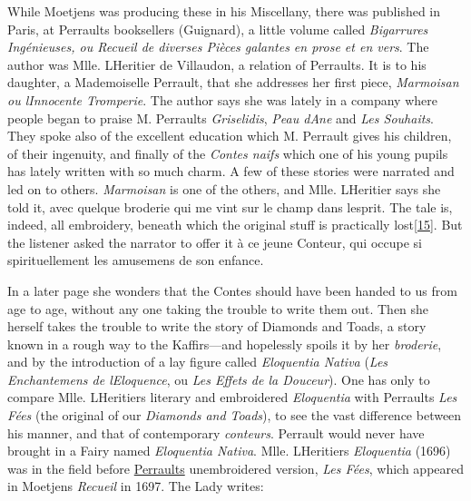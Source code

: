 \documentclass[14pt,a4paper]{memoir}
\newcommand{\ul}[1]{\uline{#1}}
\begin{document}
While Moetjens was producing these in his Miscellany, there was
published in Paris, at Perrault\textquotesingle s
bookseller\textquotesingle s (Guignard), a little volume called
\emph{Bigarrures Ingénieuses, ou Recueil de diverses Pièces galantes en
prose et en vers}. The author was Mlle. L\textquotesingle Heritier de
Villaudon, a relation of Perrault\textquotesingle s. It is to his
daughter, a Mademoiselle Perrault, that she addresses her first piece,
\emph{Marmoisan ou l\textquotesingle Innocente Tromperie}. The author
says she was lately in a company where people began to praise M.
Perrault\textquotesingle s \emph{Griselidis}, \emph{Peau
d\textquotesingle Ane} and \emph{Les Souhaits}. They spoke also of
\textquotesingle the excellent education which M. Perrault gives his
children, of their ingenuity, and finally of the \emph{Contes naifs}
which one of his young pupils has lately written with so much charm. A
few of these stories were narrated and led on to
others.\textquotesingle{} \emph{Marmoisan} is one of the others, and
Mlle. L\textquotesingle Heritier says she told it, \textquotesingle avec
quelque broderie qui me vint sur le champ dans
l\textquotesingle esprit.\textquotesingle{} The tale is, indeed, all
embroidery, beneath which the original stuff is practically
lost\protect\hypertarget{4533318093929944247_33931-h-0.htm.xhtmlux5cux23FNanchor_15}{}{}\protect\hyperlink{4533318093929944247_33931-h-0.htm.xhtmlux5cux23Footnote_15}{{[}15{]}}.
But the listener asked the narrator to offer it \textquotesingle à ce
jeune Conteur, qui occupe si spirituellement les amusemens de son
enfance.\textquotesingle{}

In a later page she wonders that the Contes should have been
\textquotesingle handed to us from age to age, without any one taking
the trouble to write them out.\textquotesingle{} Then she herself takes
the trouble to write the story of Diamonds and Toads, a story known in a
rough way to the Kaffirs---and hopelessly spoils it by her
\emph{broderie}, and by the introduction of a lay figure called
\emph{Eloquentia Nativa} (\emph{Les Enchantemens de
l\textquotesingle Eloquence}, ou \emph{Les Effets de la Douceur}). One
has only to compare Mlle. L\textquotesingle Heritier\textquotesingle s
literary and embroidered \emph{Eloquentia} with
Perrault\textquotesingle s \emph{Les Fées} (the original of our
\emph{Diamonds and Toads}), to see the vast difference between his
manner, and that of contemporary \emph{conteurs}. Perrault would never
have brought in a Fairy named \emph{Eloquentia Nativa}. Mlle.
L\textquotesingle Heritier\textquotesingle s \emph{Eloquentia} (1696)
was in the field before \ul{Perrault\textquotesingle s} unembroidered
version, \emph{Les Fées}, which appeared in Moetjens\textquotesingle{}
\emph{Recueil} in 1697. The Lady writes:
\end{document}

